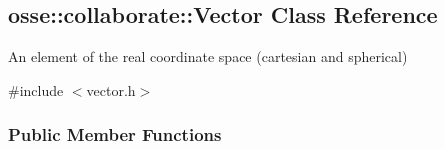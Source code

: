 \hypertarget{classosse_1_1collaborate_1_1_vector}{}\subsection{osse\+:\+:collaborate\+:\+:Vector Class Reference}
\label{classosse_1_1collaborate_1_1_vector}


An element of the real coordinate space (cartesian and spherical)  




{\ttfamily \#include $<$vector.\+h$>$}

\subsubsection*{Public Member Functions}
